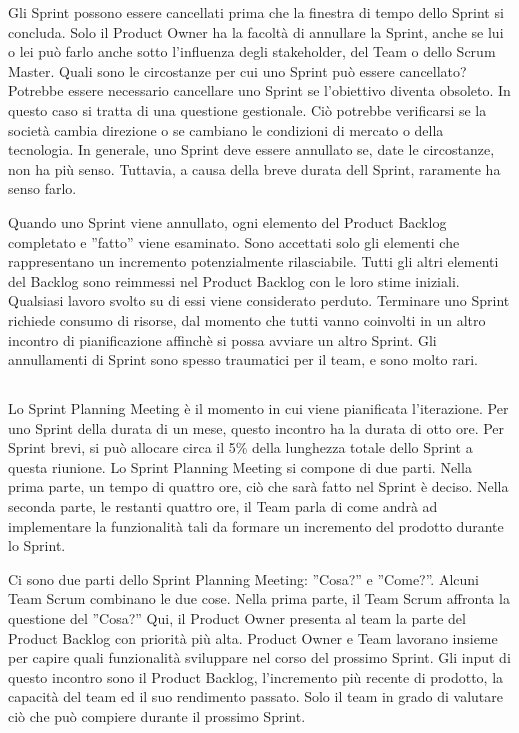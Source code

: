 Gli Sprint possono essere cancellati prima che la finestra di tempo dello Sprint si concluda. Solo il Product Owner ha
la facolt\`a di annullare la Sprint, anche se lui o lei pu\`o farlo anche sotto l'influenza degli stakeholder, del Team
o dello Scrum Master. Quali sono le circostanze per cui uno Sprint pu\`o essere cancellato? Potrebbe essere necessario
cancellare uno Sprint se l'obiettivo diventa obsoleto. In questo caso si tratta di una questione gestionale. Ci\`o
potrebbe verificarsi se la societ\`a cambia direzione o se cambiano le condizioni di mercato o della tecnologia. In
generale, uno Sprint deve essere annullato se, date le circostanze, non ha pi\`u senso. Tuttavia, a causa della breve
durata dell Sprint, raramente ha senso farlo.
\newline

Quando uno Sprint viene annullato, ogni elemento del Product Backlog completato e ''fatto'' viene esaminato. Sono
accettati solo gli elementi che rappresentano un incremento potenzialmente rilasciabile. Tutti gli altri elementi del Backlog
sono reimmessi nel Product Backlog con le loro stime iniziali. Qualsiasi lavoro svolto su di essi viene considerato
perduto. Terminare uno Sprint richiede consumo di risorse, dal momento che tutti vanno coinvolti in un altro incontro di
pianificazione affinch\`e si possa avviare un altro Sprint. Gli annullamenti di Sprint sono spesso traumatici per il
team, e sono molto rari.

\subsection*{\color{Blue}{SPRINT PLANNING MEETING}}
\label{sec:sprintplannnigmeeting}
Lo Sprint Planning Meeting \`e il momento in cui viene pianificata l'iterazione. Per uno Sprint della durata di un mese, questo
incontro ha la durata di otto ore. Per Sprint brevi, si pu\`o allocare circa il 5\% della lunghezza totale dello Sprint a questa
riunione. Lo Sprint Planning Meeting si compone di due parti. Nella prima parte, un tempo di quattro ore,  ci\`o che sar\`a fatto nel
Sprint \`e deciso. Nella seconda parte, le restanti quattro ore,  il Team parla di come andr\`a ad implementare
la funzionalit\`a tali da formare un incremento del prodotto durante lo Sprint.
\newline

Ci sono due parti dello Sprint Planning Meeting: ''Cosa?'' e ''Come?''. Alcuni Team Scrum combinano le due cose. Nella
prima parte, il Team Scrum affronta la questione del ''Cosa?'' Qui, il Product Owner presenta al team la parte del Product
Backlog con priorit\`a pi\`u alta. Product Owner e Team lavorano insieme per capire quali funzionalit\`a sviluppare nel corso del prossimo Sprint.
Gli input di questo incontro sono il Product Backlog, l'incremento pi\`u recente di prodotto, la capacit\`a del team ed
il suo rendimento passato. Solo il team in grado di valutare ci\`o che pu\`o compiere durante il prossimo Sprint.
\newline

